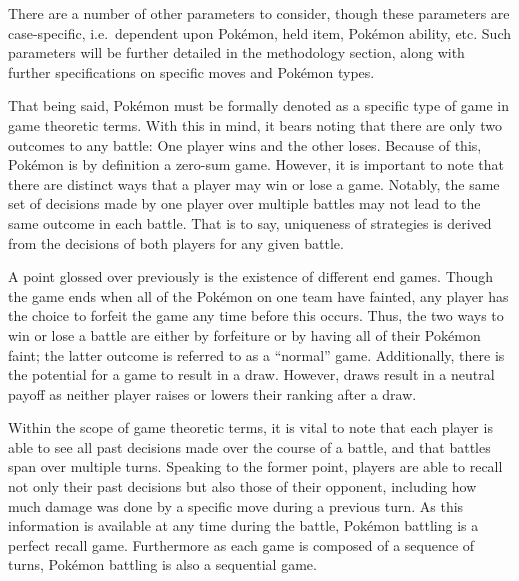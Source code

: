 \documentclass[12pt,twoside]{reedthesis}
\begin{document}
  There are a number of other parameters to consider, though these
  parameters are case-specific, i.e.~dependent upon Pokémon, held item,
  Pokémon ability, etc. Such parameters will be further detailed in the
  methodology section, along with further specifications on specific moves
  and Pokémon types.
  
  That being said, Pokémon must be formally denoted as a specific type of
  game in game theoretic terms. With this in mind, it bears noting that
  there are only two outcomes to any battle: One player wins and the other
  loses. Because of this, Pokémon is by definition a zero-sum game.
  However, it is important to note that there are distinct ways that a
  player may win or lose a game. Notably, the same set of decisions made
  by one player over multiple battles may not lead to the same outcome in
  each battle. That is to say, uniqueness of strategies is derived from
  the decisions of both players for any given battle.
  
  A point glossed over previously is the existence of different end games.
  Though the game ends when all of the Pokémon on one team have fainted,
  any player has the choice to forfeit the game any time before this
  occurs. Thus, the two ways to win or lose a battle are either by
  forfeiture or by having all of their Pokémon faint; the latter outcome
  is referred to as a ``normal'' game. Additionally, there is the
  potential for a game to result in a draw. However, draws result in a
  neutral payoff as neither player raises or lowers their ranking after a
  draw.
  
  Within the scope of game theoretic terms, it is vital to note that each
  player is able to see all past decisions made over the course of a
  battle, and that battles span over multiple turns. Speaking to the
  former point, players are able to recall not only their past decisions
  but also those of their opponent, including how much damage was done by
  a specific move during a previous turn. As this information is available
  at any time during the battle, Pokémon battling is a perfect recall
  game. Furthermore as each game is composed of a sequence of turns,
  Pokémon battling is also a sequential game.
  
\end{document}
